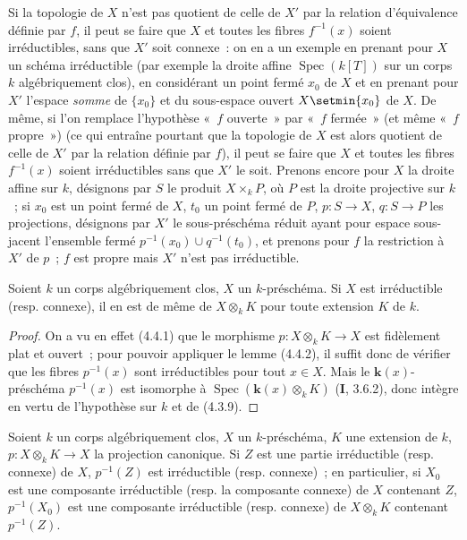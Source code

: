 \begin{remark}[4.4.3]
\label{IV.2.4.4.3-fr}
Si la topologie de $X$ n'est pas quotient de celle de $X'$ par la relation
d'équivalence définie par $f$, il peut se faire que $X$ et toutes les fibres
$f^{-1}(x)$ soient irréductibles, sans que $X'$ soit connexe~: on en a un
exemple en prenant pour $X$ un schéma irréductible (par exemple la droite
affine $\operatorname{Spec}(k[T])$ sur un corps $k$ algébriquement clos), en
considérant un point fermé $x_0$ de $X$ et en prenant pour $X'$ l'espace
\emph{somme} de $\{x_0\}$ et du sous-espace ouvert $X\setmin\{x_0\}$ de $X$. De
même, si l'on remplace l'hypothèse «~$f$ ouverte~» par «~$f$ fermée~» (et même
«~$f$ propre~») (ce qui entraîne pourtant que la topologie de $X$ est alors
quotient de celle de $X'$ par la relation définie par $f$), il peut se faire
que $X$ et toutes les fibres $f^{-1}(x)$ soient irréductibles sans que $X'$ le
soit. Prenons encore pour $X$ la droite affine sur $k$, désignons par $S$ le
produit $X\times_k P$, où $P$ est la droite projective sur
$k$~; si $x_0$ est un point fermé de $X$, $t_0$ un point fermé de $P$,
$p:S\to X$, $q:S\to P$ les projections, désignons par $X'$ le
sous-préschéma réduit ayant pour espace sous-jacent l'ensemble fermé
$p^{-1}(x_0)\cup q^{-1}(t_0)$, et prenons pour $f$ la restriction à $X'$ de
$p$~; $f$ est propre mais $X'$ n'est pas irréductible.
\end{remark}

\begin{theorem}[4.4.4]
\label{IV.2.4.4.4-fr}
Soient $k$ un corps algébriquement clos, $X$ un $k$-préschéma. Si $X$ est
irréductible \textup{(resp.} connexe\textup{)}, il en est de même de $X\otimes_k K$ pour toute
extension $K$ de $k$.
\end{theorem}

\begin{proof}
On a vu en effet (4.4.1) que le morphisme $p:X\otimes_k K\to X$ est
fidèlement plat et ouvert~; pour pouvoir appliquer le lemme (4.4.2), il suffit
donc de vérifier que les fibres $p^{-1}(x)$ sont irréductibles pour tout
$x\in X$. Mais le $\boldsymbol{k}(x)$-préschéma $p^{-1}(x)$ est isomorphe à
$\operatorname{Spec}(\boldsymbol{k}(x)\otimes_k K)$ (\textbf{I}, 3.6.2), donc intègre en vertu de
l'hypothèse sur $k$ et de (4.3.9).
\end{proof}

\begin{corollary}[4.4.5]
\label{IV.2.4.4.5-fr}
Soient $k$ un corps algébriquement clos, $X$ un $k$-préschéma, $K$ une
extension de $k$, $p:X\otimes_k K\to X$ la projection canonique. Si $Z$ est
une partie irréductible \textup{(resp.} connexe\textup{)} de $X$, $p^{-1}(Z)$ est irréductible
\textup{(resp.} connexe\textup{)}~; en particulier, si $X_0$ est une composante irréductible
\textup{(resp.} la composante connexe\textup{)} de $X$ contenant $Z$, $p^{-1}(X_0)$ est une
composante irréductible \textup{(resp.} connexe\textup{)} de $X\otimes_k K$ contenant
$p^{-1}(Z)$.
\end{corollary}

